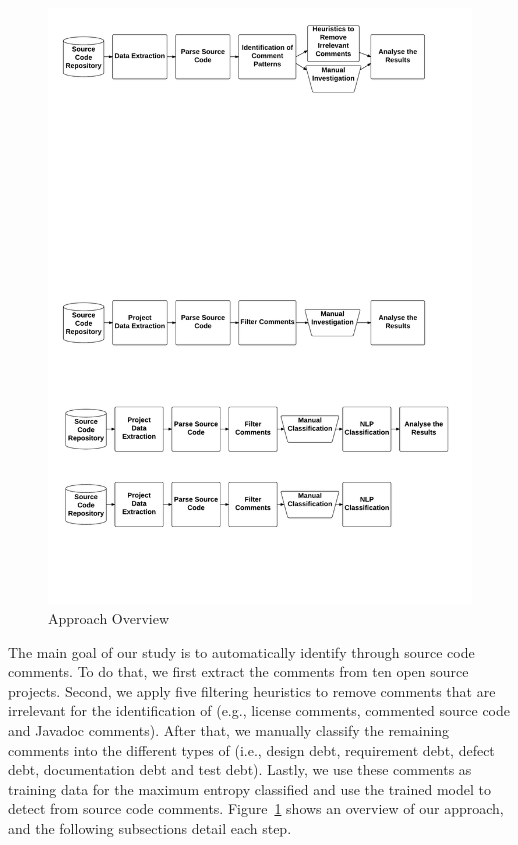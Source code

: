\begin{figure}[thb!]
  \centering
  \includegraphics[width=1\textwidth]{figures/chapter4/approach_reviwed.pdf}
  \caption{Approach Overview}
  \label{chap4:fig:approach}
\end{figure}

The main goal of our study is to automatically identify \SATD through source code comments. To do that, we first extract the comments from ten open source projects. Second, we apply five filtering heuristics to remove comments that are irrelevant for the identification of \SATD  (e.g., license comments, commented source code and Javadoc comments). After that, we manually classify the remaining comments into the different types of \SATD (i.e., design debt, requirement debt, defect debt, documentation debt and test debt). Lastly, we use these comments as training data for the maximum entropy classified and use the trained model to detect \SATD from source code comments. Figure~\ref{chap4:fig:approach} shows an overview of our approach, and the following subsections detail each step.

